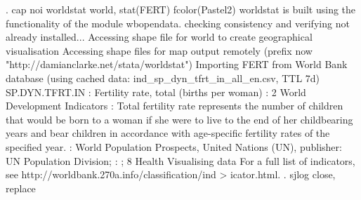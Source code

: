 .     cap noi worldstat world, stat(FERT) fcolor(Pastel2)
worldstat is built using the functionality of the module wbopendata.
checking {} consistency and verifying not already installed...
Accessing shape file for world to create geographical visualisation
Accessing shape files for map output remotely
(prefix now "http://damianclarke.net/stata/worldstat")
Importing FERT from World Bank database
(using cached data: ind_sp_dyn_tfrt_in_all_en.csv, TTL 7d)
{\smallskip}
    {} SP.DYN.TFRT.IN
    {}: Fertility rate, total (births per woman)
    {}: 2 World Development Indicators
    {}: Total fertility rate represents the number of children that
    would be born to a woman if she were to live to the end of her
    childbearing years and bear children in accordance with age-specific
    fertility rates of the specified year.
    {}: World Population Prospects, United Nations (UN), publisher: UN
    Population Division;
    {}{}{\bftt{)}}:  ; 8 Health
{\smallskip}
{\smallskip}
Visualising data
{\smallskip}
{\smallskip}
{\smallskip}
For a full list of indicators, see http://worldbank.270a.info/classification/ind
> icator.html.
.     sjlog close, replace
{\smallskip}
